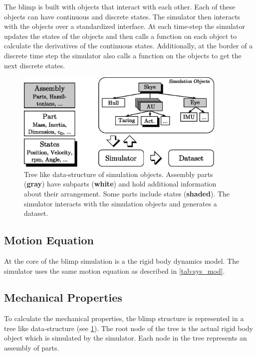 The blimp is built with objects that interact with each other.
Each of these objects can have continuous and discrete states.
The simulator then interacts with the objects over a standardized interface.
At each time-step the simulator updates the states of the objects and then calls a function on each object to calculate the derivatives of the continuous states.
Additionally, at the border of a discrete time step the simulator also calls a function on the objects to get the next discrete states.

\begin{figure}[htbp]
\centering
\includegraphics[width=0.9\textwidth]{images/sim/sim_tree.eps}
\caption{Tree like data-structure of simulation objects. Assembly parts (\textbf{gray}) have subparts (\textbf{white}) and hold additional information about their arrangement. Some parts include states (\textbf{shaded}). The simulator interacts with the simulation objects and generates a dataset.}
\label{fig:sim_tree}
\end{figure}

\subsection{Motion Equation}
\label{sub:motion_equation}
At the core of the blimp simulation is a the rigid body dynamics model. 
The simulator uses the same motion equation as described in \cref{tab:sys_mod}.

\subsection{Mechanical Properties}
\label{sub:mech_properties}
To calculate the mechanical properties, the blimp structure is represented in a tree like data-structure (see \cref{fig:sim_tree}).
The root node of the tree is the actual rigid body object which is simulated by the simulator.
Each node in the tree represents an assembly of parts. \\

